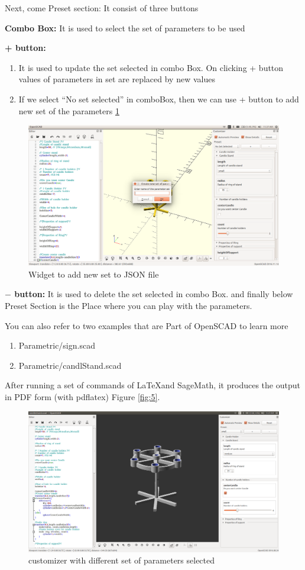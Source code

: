 Next, come Preset section: It consist of three buttons
\begin{description}
    \item \textbf{Combo Box:}
        It is used to select the set of parameters to be used
    \item \textbf{+ button:}
    \begin{enumerate}
        \item It is used to update the set selected in combo Box. On clicking + button values of parameters in set are replaced by new values
        \item If we select “No set selected” in comboBox, then we can use + button to add new set of the parameters \ref{fig:Add new set}
    \end{enumerate}
    \begin{figure}
        \centering \includegraphics[width=\linewidth]{images/output/7.png}
        \caption{Widget to add new set to JSON file}
        \label{fig:Add new set}
    \end{figure}

    \item \textbf{$-$ button: }
        It is used to delete the set selected in combo Box.
    and finally below Preset Section is the Place where you can play with the parameters.
\end{description}


You can also refer to  two examples that are Part of OpenSCAD to learn more
\begin{enumerate}
    \item Parametric/sign.scad
    \item Parametric/candlStand.scad
\end{enumerate}

After running a set of commands of \LaTeX and SageMath, it produces the
output in PDF form (with pdflatex) Figure \ref{fig:5}.

\begin{figure}
\centering \includegraphics[width=\linewidth]{images/output/9.png}
\caption{customizer with different set of parameters selected}
\label{fig:8}
\end{figure}